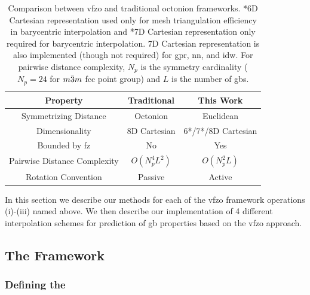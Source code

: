 \documentclass[final,twocolumn,12pt]{elsarticle}
\begin{document}
\begin{table}
\caption{Comparison between \acrlong{vfzo} and traditional octonion frameworks. *6D Cartesian representation used only for mesh triangulation efficiency in barycentric interpolation and *7D Cartesian representation only required for barycentric interpolation. 7D Cartesian representation is also implemented (though not required) for \gls{gpr}, \gls{nn}, and \gls{idw}. For pairwise distance complexity, $N_p$ is the symmetry cardinality ($N_p=24$ for $m\Bar{3}m$ \gls{fcc} point group) and $L$ is the number of \glspl{gb}.}
\centering
\begin{tabular}{ccc}
\toprule
Property & Traditional & This Work \\
\midrule
Symmetrizing Distance & Octonion & Euclidean \\
Dimensionality & 8D Cartesian & 6*/7*/8D Cartesian \\
Bounded by \gls{fz} & No & Yes \\
Pairwise Distance Complexity & $O(N_p^4L^2)$ & $O(N_p^2L)$ \\
Rotation Convention & Passive & Active \\
\bottomrule
\end{tabular}
\label{tab:closed-mesh-comparison}
\end{table}

In this section we describe our methods for each of the \gls{vfzo} framework operations (i)-(iii) named above. We then describe our implementation of 4 different interpolation schemes for prediction of \gls{gb} properties based on the \gls{vfzo} approach.

\subsection{The  Framework}
\label{sec:methods:framework}

\subsubsection{Defining the }
\label{sec:methods:framework:vfz}

\end{document}
